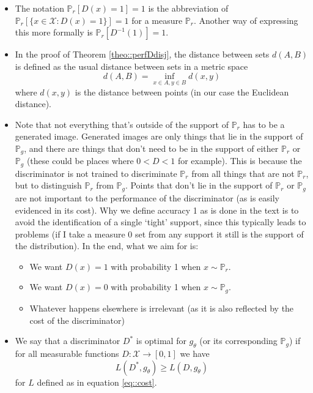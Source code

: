 \documentclass{article} %
\newcommand\PP{\mathbb{P}}
\theoremstyle{definition}
\begin{document}
\begin{appendices}
\begin{itemize}
The annoying part is that in everyday paper writing when we talk about
continuous random variables, we omit the `absolutely' word to keep the
text concise and actually talk about absolutely continuous random variables
(ones that have a density), this is done through almost all sciences and
throughout mathematics as well, annoying as it is. However we made the
clarification in here since it's relevant to our paper not to mistake the two terms.
  \item The notation $\PP_r[D(x) = 1] = 1$ is the abbreviation of
$\PP_r[\{x \in \mathcal{X}: D(x) = 1\}] = 1$ for a measure $\PP_r$.
Another way of expressing this more formally is $\PP_r[D^{-1}(1)] = 1$.
  \item In the proof of Theorem \autoref{theo::perfDdisj}, the distance
between sets $d(A, B)$ is defined as the usual distance between sets
in a metric space
$$ d(A, B) = \inf_{x \in A, y \in B} d(x,y) $$
where $d(x, y)$ is the distance between points (in our case the
Euclidean distance).
  \item Note that not everything that's outside of the support 
of $\PP_r$ has to be a generated image. Generated images are only
things that lie in the support of $\PP_g$, and there are things that
don't need to be in the support of either $\PP_r$ or $\PP_g$ (these could
be places where $0 < D < 1$ for example). This is because the discriminator
is not trained to discriminate $\PP_r$ from all things that are not
$\PP_r$, but to distinguish $\PP_r$ from $\PP_g$. Points that don't
lie in the support of $\PP_r$ or $\PP_g$ are not important to the 
performance of the discriminator (as is easily evidenced in its cost).
Why we define accuracy 1 as is done in the text is to avoid the
identification of a single `tight' support, since this typically
leads to problems (if I take a measure 0 set from any support it
still is the support of the distribution). In the end, what we aim for is:
\begin{itemize}
  \item  We want $D(x) = 1$ with probability 1  when $x \sim \PP_r$.
  \item  We want $D(x) = 0$ with probability 1 when $x \sim \PP_g$.
  \item  Whatever happens elsewhere is irrelevant (as it is also reflected by the cost of the discriminator)
\end{itemize}
\item We say that a discriminator $D^*$ is optimal for $g_\theta$
(or its corresponding $\PP_g$)
if for all measurable functions $D: \mathcal{X} \rightarrow [0,1]$
we have
$$ L(D^*, g_\theta) \geq L(D, g_\theta) $$
for $L$ defined as in equation \eqref{eq::cost}.
\end{itemize}

\end{appendices}
\end{document}
